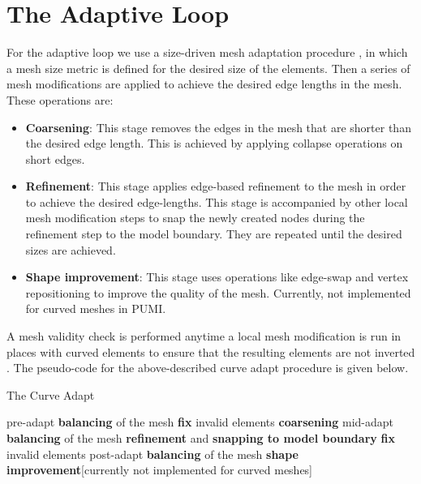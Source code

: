 \documentclass[review,12pt]{elsarticle_summary_report}
\begin{document}


\section{\label{adaptive_loop}The Adaptive Loop}

For the adaptive loop we use a size-driven mesh adaptation procedure \cite{LiShephard_03}, in which a mesh size metric is defined for the desired size of the elements. Then a series of mesh modifications are applied to achieve the desired edge lengths in the mesh. These operations are:
\begin{itemize}
  \item \textbf{Coarsening}: This stage removes the edges in the mesh that are shorter than the desired edge length. This is achieved by applying collapse operations on short edges.
  \item \textbf{Refinement}: This stage applies edge-based refinement to the mesh in order to achieve the desired edge-lengths. This stage is accompanied by other local mesh modification steps to snap the newly created nodes during the refinement step to the model boundary. They are repeated until the desired sizes are achieved.
  \item \textbf{Shape improvement}: This stage uses operations like edge-swap and vertex repositioning to improve the quality of the mesh. Currently, not implemented for curved meshes in PUMI.
\end{itemize}
A mesh validity check is performed anytime a local mesh modification is run in places with curved elements to ensure that the resulting elements are not inverted \cite[see][for more details]{LuoShephard_11}. The pseudo-code for the above-described curve adapt procedure is given below.

\begin{algorithm}
\caption{The Curve Adapt}\label{crv_adapt}
\begin{algorithmic}[1]
\State pre-adapt \textbf{balancing} of the mesh
\State \textbf{fix} invalid elements 
\State \textbf{coarsening}
\State mid-adapt \textbf{balancing} of the mesh
\State \textbf{refinement} and \textbf{snapping to model boundary}
\State \textbf{fix} invalid elements 
\State post-adapt \textbf{balancing} of the mesh
\State \textbf{shape improvement}[currently not implemented for curved meshes]
\EndProcedure
\end{algorithmic}
\end{algorithm}
\end{document}
